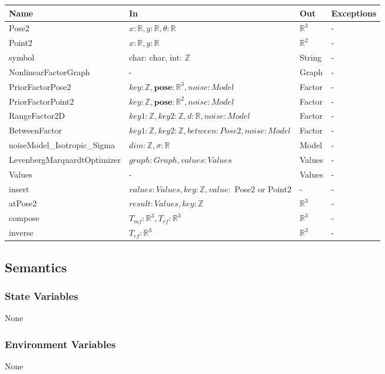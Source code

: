 \documentclass[12pt, titlepage]{article}
\begin{document}
\begin{center}
\begin{tabular}{p{6cm} p{6cm} p{2cm} p{3cm}}
\hline
\textbf{Name} & \textbf{In} & \textbf{Out} & \textbf{Exceptions} \\
\hline
Pose2 & $x: \mathbb{R}, y: \mathbb{R}, \theta: \mathbb{R}$ & $\mathbb{R}^{3}$ & - \\
Point2 & $x: \mathbb{R}, y: \mathbb{R}$  & $\mathbb{R}^{2}$  & - \\
symbol & char: char, int: $\mathbb{Z}$  & String & - \\
NonlinearFactorGraph & - & Graph & - \\
PriorFactorPose2 & $key:\mathbb{Z}, \textbf{pose}: \mathbb{R}^3, noise: Model$ & Factor & - \\
PriorFactorPoint2 & $key:\mathbb{Z}, \textbf{pose}: \mathbb{R}^2, noise: Model$& Factor& - \\
RangeFactor2D &  $key1: \mathbb{Z}, key2: \mathbb{Z}, d: \mathbb{R}, noise: Model$  & Factor & - \\
BetweenFactor &  $key1: \mathbb{Z}, key2: \mathbb{Z}, between: Pose2, noise: Model$  & Factor & - \\
noiseModel\_Isotropic\_Sigma & $dim: \mathbb{Z}, \sigma: \mathbb{R}$ & Model & - \\
LevenbergMarquardtOptimizer & $graph: Graph, values: Values$ & Values & - \\
Values & - & Values & - \\
insert & $values: Values, key: \mathbb{Z}, value:$ Pose2 or Point2 & - & - \\
atPose2 & $result: Values, key: \mathbb{Z}$  & $\mathbb{R}^3$ & - \\
compose & $T_{mf}: \mathbb{R}^3, T_{rf}: \mathbb{R}^3$ & $\mathbb{R}^3$ & - \\
inverse &  $T_{rf}: \mathbb{R}^3$ & $\mathbb{R}^3$ & - \\
\hline
\end{tabular}
\end{center}

\subsection{Semantics}

\subsubsection{State Variables}
None

\subsubsection{Environment Variables}
None
\end{document}
